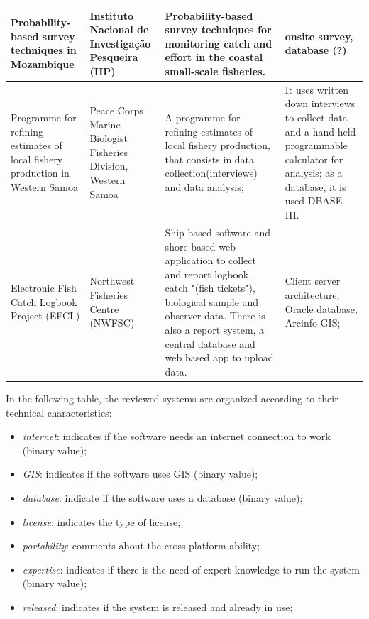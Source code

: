 \documentclass[11pt]{article} %
\begin{document}
\begin{center}
\begin{supertabular}{ | p{0.2\textwidth} | p{0.2\textwidth} | p{0.2\textwidth} | p{0.2\textwidth} |}
Probability-based survey techniques in Mozambique & Instituto Nacional de Investigação Pesqueira (IIP) & Probability-based survey techniques for monitoring catch and effort in the coastal small-scale fisheries. & onsite survey, database (?) \\ \hline
Programme for refining estimates of local fishery production in Western Samoa & Peace Corps Marine Biologist Fisheries Division, Western Samoa & A programme for refining estimates of local fishery production, that consists in data collection(interviews) and data analysis; & It uses written down interviews to collect data and a hand-held programmable calculator for analysis; as a database, it is used DBASE III. \\ \hline
Electronic Fish Catch Logbook Project (EFCL) & Northwest Fisheries Centre (NWFSC) & Ship-based software and shore-based web application to collect and report logbook, catch "(fish tickets"), biological sample and observer data. There is also a report system, a central database and web based app to upload data. & Client server architecture, Oracle database, Arcinfo GIS; \\ \hline
\end{supertabular}
\end{center}

In the following table, the reviewed systems are organized according to their technical characteristics:
\begin{itemize}
\item {\it internet}: indicates if the software needs an internet connection to work (binary value);
\item {\it GIS}: indicates if the software uses GIS (binary value);
\item {\it database}: indicate if the software uses a database (binary value);
\item {\it license}: indicates the type of license;
\item {\it portability}: comments about the cross-platform ability;
\item {\it expertise}: indicates if there is the need of expert knowledge to run the system (binary value);
\item {\it released}: indicates if the system is released and already in use; 
\end{itemize}
\end{document}
